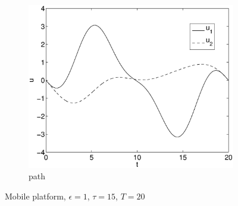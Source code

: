 \begin{figure}[h]
\begin{subfigure}[b]{\textwidth}
\centering
\includegraphics[height=0.3\textheight]{img/final_15_1_20_u.eps}
\caption{path}
\end{subfigure}
\caption{Mobile platform, $\epsilon=1$, $\tau=15$, $T=20$}
\label{fig:pl2}
\end{figure}


